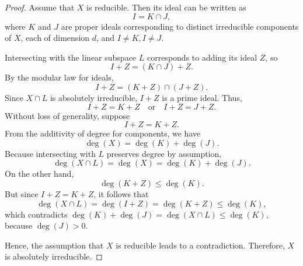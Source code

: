 \documentclass[10pt,a4paper]{amsart}
\begin{document}
\begin{proof}
Assume that \(X\) is reducible. Then its ideal can be written as
\[
I = K \cap J,
\]
where \(K\) and \(J\) are proper ideals corresponding to distinct irreducible components of \(X\), each of dimension \(d\), and \(I \neq K, I \neq J\).

Intersecting with the linear subspace \(L\) corresponds to adding its ideal \(Z\), so
\[
I + Z = (K \cap J) + Z.
\]
By the modular law for ideals,
\[
I + Z = (K + Z) \cap (J + Z).
\]
Since \(X \cap L\) is absolutely irreducible, \(I + Z\) is a prime ideal. Thus,
\[
I + Z = K + Z \quad \text{or} \quad I + Z = J + Z.
\]
Without loss of generality, suppose
\[
I + Z = K + Z.
\]
From the additivity of degree for components, we have
\[
\deg(X) = \deg(K) + \deg(J).
\]
Because intersecting with \(L\) preserves degree by assumption,
\[
\deg(X \cap L) = \deg(X) = \deg(K) + \deg(J).
\]
On the other hand, 
\[
\deg(K + Z) \leq \deg(K).
\]
But since \(I + Z = K + Z\), it follows that
\[
\deg(X \cap L) = \deg(I + Z) = \deg(K + Z) \leq \deg(K),
\]
which contradicts $\deg(K) + \deg(J) = \deg(X \cap L) \leq \deg(K),$
because \(\deg(J) > 0\).

Hence, the assumption that \(X\) is reducible leads to a contradiction. Therefore, \(X\) is absolutely irreducible.
\end{proof}
\end{document}
